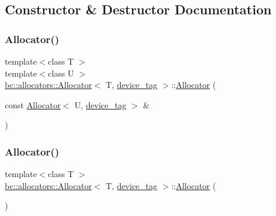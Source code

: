 \subsection{Constructor \& Destructor Documentation}
\mbox{\label{structbc_1_1allocators_1_1Allocator_3_01T_00_01device__tag_01_4_a88d0cc2114abb58361cfa739f1e190e7}} 
\subsubsection{\texorpdfstring{Allocator()}{Allocator()}\hspace{0.1cm}{\footnotesize\ttfamily [1/2]}}
{\footnotesize\ttfamily template$<$class T $>$ \\
template$<$class U $>$ \\
\hyperlink{classbc_1_1allocators_1_1Allocator}{bc\+::allocators\+::\+Allocator}$<$ T, \hyperlink{structbc_1_1device__tag}{device\+\_\+tag} $>$\+::\hyperlink{classbc_1_1allocators_1_1Allocator}{Allocator} (\begin{DoxyParamCaption}\item[{const \hyperlink{classbc_1_1allocators_1_1Allocator}{Allocator}$<$ U, \hyperlink{structbc_1_1device__tag}{device\+\_\+tag} $>$ \&}]{ }\end{DoxyParamCaption})\hspace{0.3cm}{\ttfamily [inline]}}

\mbox{\label{structbc_1_1allocators_1_1Allocator_3_01T_00_01device__tag_01_4_aef910f60bb75fdfc303d99aa779d1de1}} 
\subsubsection{\texorpdfstring{Allocator()}{Allocator()}\hspace{0.1cm}{\footnotesize\ttfamily [2/2]}}
{\footnotesize\ttfamily template$<$class T $>$ \\
\hyperlink{classbc_1_1allocators_1_1Allocator}{bc\+::allocators\+::\+Allocator}$<$ T, \hyperlink{structbc_1_1device__tag}{device\+\_\+tag} $>$\+::\hyperlink{classbc_1_1allocators_1_1Allocator}{Allocator} (\begin{DoxyParamCaption}{ }\end{DoxyParamCaption})\hspace{0.3cm}{\ttfamily [default]}}



